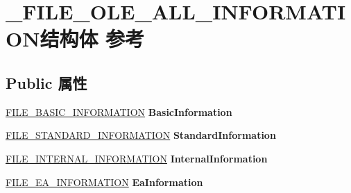 \hypertarget{struct___f_i_l_e___o_l_e___a_l_l___i_n_f_o_r_m_a_t_i_o_n}{}\section{\+\_\+\+F\+I\+L\+E\+\_\+\+O\+L\+E\+\_\+\+A\+L\+L\+\_\+\+I\+N\+F\+O\+R\+M\+A\+T\+I\+O\+N结构体 参考}
\label{struct___f_i_l_e___o_l_e___a_l_l___i_n_f_o_r_m_a_t_i_o_n}
\subsection*{Public 属性}
\begin{DoxyCompactItemize}
\item 
\mbox{\label{struct___f_i_l_e___o_l_e___a_l_l___i_n_f_o_r_m_a_t_i_o_n_acef2cc6863c7e52adf8e7ecc217549a5}} 
\hyperlink{struct___f_i_l_e___b_a_s_i_c___i_n_f_o_r_m_a_t_i_o_n}{F\+I\+L\+E\+\_\+\+B\+A\+S\+I\+C\+\_\+\+I\+N\+F\+O\+R\+M\+A\+T\+I\+ON} {\bfseries Basic\+Information}
\item 
\mbox{\label{struct___f_i_l_e___o_l_e___a_l_l___i_n_f_o_r_m_a_t_i_o_n_aa0d0b6cfa3487ad0bd86d71c5931efbd}} 
\hyperlink{struct___f_i_l_e___s_t_a_n_d_a_r_d___i_n_f_o_r_m_a_t_i_o_n}{F\+I\+L\+E\+\_\+\+S\+T\+A\+N\+D\+A\+R\+D\+\_\+\+I\+N\+F\+O\+R\+M\+A\+T\+I\+ON} {\bfseries Standard\+Information}
\item 
\mbox{\label{struct___f_i_l_e___o_l_e___a_l_l___i_n_f_o_r_m_a_t_i_o_n_ad28c5077ac40d2c7dafea334343bc7b7}} 
\hyperlink{struct___f_i_l_e___i_n_t_e_r_n_a_l___i_n_f_o_r_m_a_t_i_o_n}{F\+I\+L\+E\+\_\+\+I\+N\+T\+E\+R\+N\+A\+L\+\_\+\+I\+N\+F\+O\+R\+M\+A\+T\+I\+ON} {\bfseries Internal\+Information}
\item 
\mbox{\label{struct___f_i_l_e___o_l_e___a_l_l___i_n_f_o_r_m_a_t_i_o_n_a91699d584a4dd3ef829e73f0ea869c9c}} 
\hyperlink{struct___f_i_l_e___e_a___i_n_f_o_r_m_a_t_i_o_n}{F\+I\+L\+E\+\_\+\+E\+A\+\_\+\+I\+N\+F\+O\+R\+M\+A\+T\+I\+ON} {\bfseries Ea\+Information}
\item 

\end{DoxyCompactItemize}
